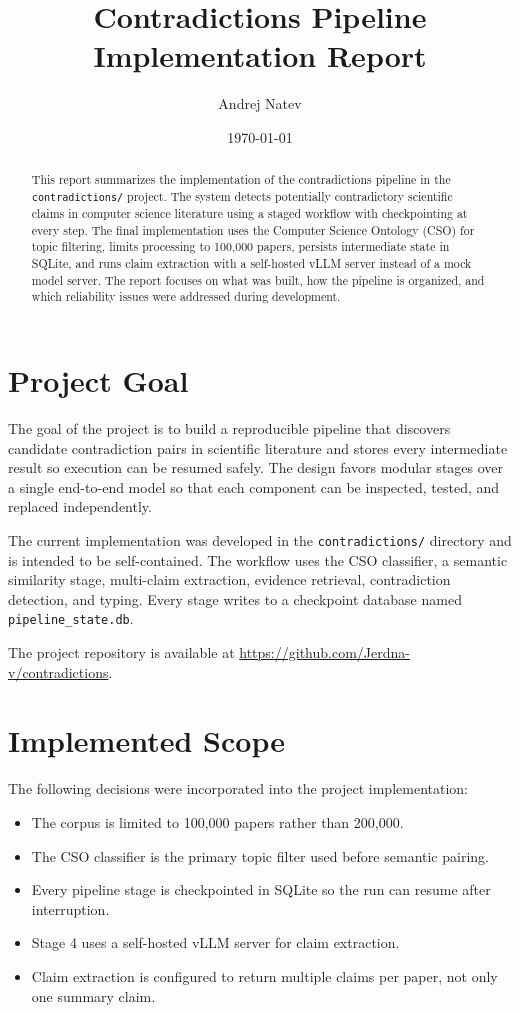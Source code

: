 \documentclass[11pt]{article}
\title{Contradictions Pipeline Implementation Report}
\author{Andrej Natev}
\date{\today}
\begin{document}
\maketitle

\begin{abstract}
This report summarizes the implementation of the contradictions pipeline in the \texttt{contradictions/} project. The system detects potentially contradictory scientific claims in computer science literature using a staged workflow with checkpointing at every step. The final implementation uses the Computer Science Ontology (CSO) for topic filtering, limits processing to 100{,}000 papers, persists intermediate state in SQLite, and runs claim extraction with a self-hosted vLLM server instead of a mock model server. The report focuses on what was built, how the pipeline is organized, and which reliability issues were addressed during development.
\end{abstract}

\section{Project Goal}
The goal of the project is to build a reproducible pipeline that discovers candidate contradiction pairs in scientific literature and stores every intermediate result so execution can be resumed safely. The design favors modular stages over a single end-to-end model so that each component can be inspected, tested, and replaced independently.

The current implementation was developed in the \texttt{contradictions/} directory and is intended to be self-contained. The workflow uses the CSO classifier, a semantic similarity stage, multi-claim extraction, evidence retrieval, contradiction detection, and typing. Every stage writes to a checkpoint database named \texttt{pipeline\_state.db}.

The project repository is available at \href{https://github.com/Jerdna-v/contradictions}{https://github.com/Jerdna-v/contradictions}.

\section{Implemented Scope}
The following decisions were incorporated into the project implementation:
\begin{itemize}[noitemsep]
    \item The corpus is limited to 100{,}000 papers rather than 200{,}000.
    \item The CSO classifier is the primary topic filter used before semantic pairing.
    \item Every pipeline stage is checkpointed in SQLite so the run can resume after interruption.
    \item Stage 4 uses a self-hosted vLLM server for claim extraction.
    \item Claim extraction is configured to return multiple claims per paper, not only one summary claim.
\end{itemize}
\end{document}

